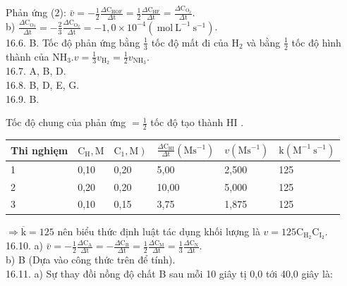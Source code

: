 \documentclass[10pt]{article}
\begin{document}
Phản ứng (2): $\bar{v}=-\frac{1}{2} \frac{\Delta \mathrm{C}_{\mathrm{HOF}}}{\Delta \mathrm{t}}=\frac{1}{2} \frac{\Delta \mathrm{C}_{\mathrm{HF}}}{\Delta \mathrm{t}}=\frac{\Delta \mathrm{C}_{\mathrm{O}_{2}}}{\Delta \mathrm{t}}$.\\
b) $\frac{\Delta \mathrm{C}_{\mathrm{O}_{3}}}{\Delta \mathrm{t}}=-\frac{2}{3} \frac{\Delta \mathrm{C}_{\mathrm{O}_{2}}}{\Delta \mathrm{t}}=-1,0 \times 10^{-4}\left(\mathrm{~mol} \mathrm{~L}^{-1} \mathrm{~s}^{-1}\right)$.\\
16.6. B. Tốc độ phản ứng bằng $\frac{1}{3}$ tốc độ mất đi của $\mathrm{H}_{2}$ và bằng $\frac{1}{2}$ tốc độ hình thành của $\mathrm{NH}_{3} . v=\frac{1}{3} v_{\mathrm{H}_{2}}=\frac{1}{2} v_{\mathrm{NH}_{3}}$.\\
16.7. A, B, D.\\
16.8. B, D, E, G.\\
16.9. B.

Tốc độ chung của phản ứng $=\frac{1}{2}$ tốc độ tạo thành HI .

\begin{center}
\begin{tabular}{|l|l|l|l|l|l|}
\hline
Thi nghięm & $\mathrm{C}_{\mathrm{H}}, \mathrm{M}$ & $\left.\mathrm{C}_{1}, \mathrm{M}\right)$ & $\frac{\Delta \mathrm{C}_{\mathrm{HI}}}{\Delta \mathrm{t}}\left(\mathrm{M} \mathrm{s}^{-1}\right)$ & $v\left(\mathrm{M} \mathrm{s}^{-1}\right)$ & $\mathrm{k}\left(\mathrm{M}^{-1} \mathrm{~s}^{-1}\right)$ \\
\hline
1 & 0,10 & 0,20 & 5,00 & 2,500 & 125 \\
\hline
2 & 0,20 & 0,20 & 10,00 & 5,000 & 125 \\
\hline
3 & 0,10 & 0,15 & 3,75 & 1,875 & 125 \\
\hline
\end{tabular}
\end{center}

$\Rightarrow \overline{\mathrm{k}}=125$ nên biểu thức định luật tác dụng khối lượng là $v=125 \mathrm{C}_{\mathrm{H}_{2}} \mathrm{C}_{\mathrm{I}_{2}}$.\\
16.10. a) $\bar{v}=-\frac{1}{2} \frac{\Delta \mathrm{C}_{\mathrm{A}}}{\Delta \mathrm{t}}=-\frac{\Delta \mathrm{C}_{\mathrm{B}}}{\Delta \mathrm{t}}=\frac{1}{2} \frac{\Delta \mathrm{C}_{\mathrm{M}}}{\Delta \mathrm{t}}=\frac{1}{3} \frac{\Delta \mathrm{C}_{\mathrm{N}}}{\Delta \mathrm{t}}$.\\
b) B (Dựa vào công thức trên để tính).\\
16.11. a) Sự thay đồi nồng độ chất B sau mỗi 10 giây tị 0,0 tới 40,0 giây là:
\end{document}
